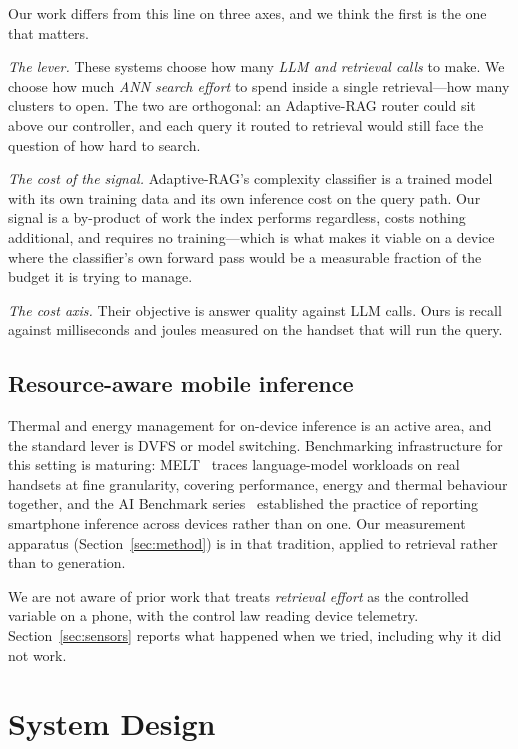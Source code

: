 \documentclass[conference]{IEEEtran}
\begin{document}
Our work differs from this line on three axes, and we think the first is the
one that matters.

\emph{The lever.} These systems choose how many \emph{LLM and retrieval calls}
to make. We choose how much \emph{ANN search effort} to spend inside a single
retrieval---how many clusters to open. The two are orthogonal: an
Adaptive-RAG router could sit above our controller, and each query it routed to
retrieval would still face the question of how hard to search.

\emph{The cost of the signal.} Adaptive-RAG's complexity classifier is a trained
model with its own training data and its own inference cost on the query path.
Our signal is a by-product of work the index performs regardless, costs nothing
additional, and requires no training---which is what makes it viable on a device
where the classifier's own forward pass would be a measurable fraction of the
budget it is trying to manage.

\emph{The cost axis.} Their objective is answer quality against LLM calls. Ours
is recall against milliseconds and joules measured on the handset that will run
the query.

\subsection{Resource-aware mobile inference}

Thermal and energy management for on-device inference is an active area, and
the standard lever is DVFS or model switching. Benchmarking infrastructure for
this setting is maturing: MELT~\cite{laskaridis2024melt} traces language-model
workloads on real handsets at fine granularity, covering performance, energy
and thermal behaviour together, and the AI Benchmark
series~\cite{ignatov2019aibench} established the practice of reporting
smartphone inference across devices rather than on one. Our measurement
apparatus (Section~\ref{sec:method}) is in that tradition, applied to retrieval
rather than to generation.

We are not aware of prior work that treats \emph{retrieval effort} as the
controlled variable on a phone, with the control law reading device telemetry.
Section~\ref{sec:sensors} reports what happened when we tried, including why it
did not work.

\section{System Design}
\end{document}
